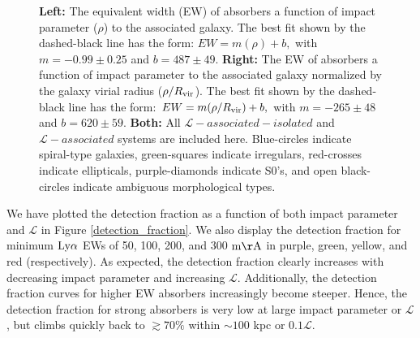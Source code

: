 \documentclass[twocolumn,tighten]{aastex62}
\begin{document}
\begin{figure}[ht!]
        \centering
        \vspace{0pt}
        \caption{\small{\textbf{Left: } The equivalent width (EW) of absorbers a function of impact parameter ($\rho$) to the associated galaxy. The best fit shown by the dashed-black line has the form: $EW = m (\rho) + b,$ with $m = -0.99 \pm 0.25$ and $b = 487 \pm 49$. \textbf{Right:} The EW of absorbers a function of impact parameter to the associated galaxy normalized by the galaxy virial radius ($\rho / R_{\rm vir}$). The best fit shown by the dashed-black line has the form: $EW = m (\rho / R_{\rm vir}) + b,$ with $m = -265 \pm 48$ and $b = 620 \pm 59$. \textbf{Both:} All $\mathcal{L}-associated-isolated$ and $\mathcal{L}-associated$ systems are included here. Blue-circles indicate spiral-type galaxies, green-squares indicate irregulars, red-crosses indicate ellipticals, purple-diamonds indicate S0's, and open black-circles indicate ambiguous morphological types. }}
        \vspace{5pt}
        \label{ew_both}
\end{figure}

We have plotted the detection fraction as a function of both impact parameter and $\mathcal{L}$ in Figure \ref{detection_fraction}. We also display the detection fraction for minimum $\rm Ly\alpha$ EWs of 50, 100, 200, and 300 $\rm m\AA$ in purple, green, yellow, and red (respectively). As expected, the detection fraction clearly increases with decreasing impact parameter and increasing $\mathcal{L}$. Additionally, the detection fraction curves for higher EW absorbers increasingly become steeper. Hence, the detection fraction for strong absorbers is very low at large impact parameter or $\mathcal{L}$, but climbs quickly back to $\gtrsim 70\%$ within $\sim 100$ kpc or $0.1 \mathcal{L}$. 
\end{document}
